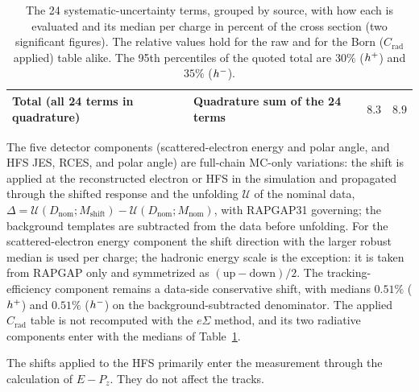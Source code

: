 \begin{table}[h]
\begin{tabular}{p{4.4cm}p{7.0cm}rr}
\midrule
Total (all 24 terms in quadrature) & Quadrature sum of the 24 terms & $8.3$ & $8.9$ \\
\bottomrule
\end{tabular}
\caption{The 24 systematic-uncertainty terms, grouped by source, with how each is evaluated and its median per
charge in percent of the cross section (two significant figures).  The relative values hold for the raw and
for the Born (\texorpdfstring{$C_{\mathrm{rad}}$}{C\_rad} applied) table alike.
The 95th percentiles of the quoted total are $30\%$ ($h^{+}$) and
$35\%$ ($h^{-}$).}
\label{tab:syst:z005-components}
\end{table}

The five detector components (scattered-electron energy and polar angle, and
HFS JES, RCES, and polar angle) are full-chain MC-only variations: the
shift is applied at the reconstructed electron or HFS in the simulation and
propagated through the shifted response and the unfolding $\mathcal{U}$ of the nominal data,
$\Delta=\mathcal{U}(D_{\mathrm{nom}};M_{\mathrm{shift}})-
\mathcal{U}(D_{\mathrm{nom}};M_{\mathrm{nom}})$, with RAPGAP31 governing; the
background templates are subtracted from the data before unfolding.  For the
scattered-electron energy component
the shift direction with the larger robust median is used per charge; the
hadronic energy scale is the exception: it is taken from RAPGAP only and symmetrized
as $(\mathrm{up}-\mathrm{down})/2$.  The tracking-efficiency component
remains a data-side conservative shift, with medians $0.51\%$
($h^{+}$) and $0.51\%$ ($h^{-}$) on the background-subtracted denominator.  The
applied $C_{\mathrm{rad}}$ table is not recomputed with the $e\Sigma$ method, and its two
radiative components enter with the medians of Table~\ref{tab:syst:z005-components}.

The shifts applied to the HFS primarily enter the measurement through the calculation of $E-P_z$. They do not affect the tracks.

